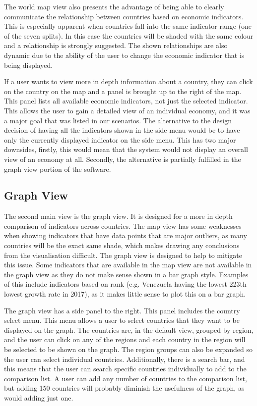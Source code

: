 \documentclass[10pt, journal]{IEEEtran}
\begin{document}
The world map view also presents the advantage of being able to clearly communicate the relationship between countries based on economic indicators. This is especially apparent when countries fall into the same indicator range (one of the seven splits). In this case the countries will be shaded with the same colour and a relationship is strongly suggested. The shown relationships are also dynamic due to the ability of the user to change the economic indicator that is being displayed.

If a user wants to view more in depth information about a country, they can click on the country on the map and a panel is brought up to the right of the map. This panel lists all available economic indicators, not just the selected indicator. This allows the user to gain a detailed view of an individual economy, and it was a major goal that was listed in our scenarios. The alternative to the design decision of having all the indicators shown in the side menu would be to have only the currently displayed indicator on the side menu. This has two major downsides, firstly, this would mean that the system would not display an overall view of an economy at all. Secondly, the alternative is partially fulfilled in the graph view portion of the software.

\subsection{Graph View}

The second main view is the graph view. It is designed for a more in depth comparison of indicators across countries. The map view has some weaknesses when showing indicators that have data points that are major outliers, as many countries will be the exact same shade, which makes drawing any conclusions from the visualisation difficult. The graph view is designed to help to mitigate this issue. Some indicators that are available in the map view are not available in the graph view as they do not make sense shown in a bar graph style. Examples of this include indicators based on rank (e.g. Venezuela having the lowest 223th lowest growth rate in 2017), as it makes little sense to plot this on a bar graph. 

The graph view has a side panel to the right. This panel includes the country select menu. This menu allows a user to select countries that they want to be displayed on the graph. The countries are, in the default view, grouped by region, and the user can click on any of the regions and each country in the region will be selected to be shown on the graph. The region groups can also be expanded so the user can select individual countries. Additionally, there is a search bar, and this means that the user can search specific countries individually to add to the comparison list. A user can add any number of countries to the comparison list, but adding 150 countries will probably diminish the usefulness of the graph, as would adding just one.
\end{document}

